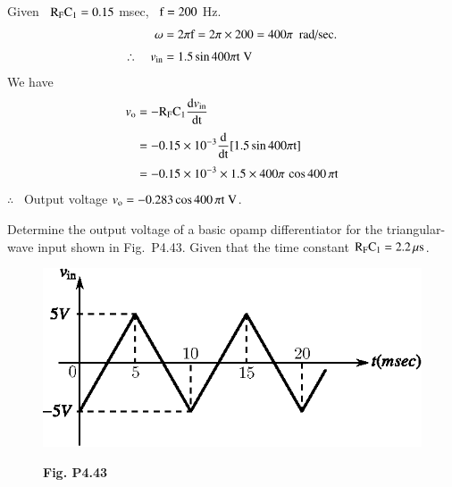 \begin{solution}
Given \ $\textrm{R}_{\textrm{F}}\textrm{C}_{1}=0.15$ msec, \ $\textrm{f}=200$ Hz.
\begin{align*}
\omega &= 2\pi \textrm{f} = 2\pi \times 200=400 \pi\text{~ rad/sec.}\\[3pt]
\therefore\quad v_{\text{in}} &= 1.5\sin 400 \pi \textrm{t}\;\textrm{V}
\end{align*}
We have
\begin{align*}
v_{\textrm{o}} &= -\textrm{R}_{\textrm{F}}\textrm{C}_{1}\dfrac{\textrm{d} v_{\text{in}}}{\operatorname{dt}}\\[3pt]
&= -0.15\times 10^{-3}\dfrac{\textrm{d}}{\operatorname{dt}}[1.5\sin 400 \pi \textrm{t}]\\[3pt]
&= -0.15\times 10^{-3}\times 1.5\times 400\pi\,\cos 400 \,\pi \textrm{t}
\end{align*}
$\therefore$~ Output voltage $v_{\textrm{o}}=-0.283\cos 400\,\pi\textrm{t} \ \textrm{V}$.
\end{solution}

\begin{problem}\label{prob4.43}
Determine the output voltage of a basic opamp differentiator for the triangular-wave input shown in Fig.~P4.43. Given that the time constant $\textrm{R}_{\textrm{F}}\textrm{C}_{1}=2.2\,\mu\textrm{s}$.
\begin{figure}[H]
\centering
\includegraphics{chap4/figP4.42.eps}

\smallskip
{\bf Fig. P4.43}
\end{figure}
\end{problem}

